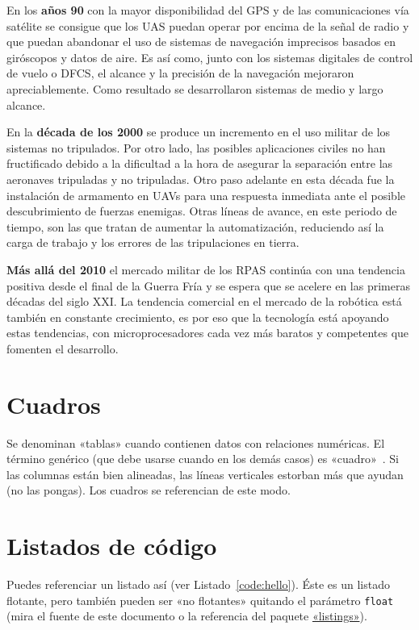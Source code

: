 En los \textbf{años 90} con la mayor disponibilidad del \acs{GPS} y de las comunicaciones vía satélite se consigue que los \acs{UAS} puedan operar por encima de la señal de radio y que puedan abandonar el uso de sistemas de navegación imprecisos basados en giróscopos y
datos de aire. Es así como, junto con los sistemas digitales de control de vuelo o \acs{DFCS}, el alcance y la precisión de la navegación mejoraron apreciablemente. 
Como resultado se desarrollaron sistemas de medio y largo alcance. 

En la \textbf{década de los 2000} se produce un incremento en el uso militar de los sistemas no tripulados. 
Por otro lado, las posibles aplicaciones civiles no han fructificado debido a la dificultad a la hora de asegurar la 
separación entre las aeronaves tripuladas y no tripuladas.
Otro paso adelante en esta década fue la instalación de armamento en \acs{UAV}s para una respuesta inmediata ante el posible 
descubrimiento de fuerzas enemigas.
Otras líneas de avance, en este periodo de tiempo, son las que tratan de aumentar la automatización, reduciendo así
la carga de trabajo y los errores de las tripulaciones en tierra.

\textbf{Más allá del 2010} el mercado militar de los \acs{RPAS} continúa con una tendencia positiva desde el final de la Guerra Fría y se espera que se acelere en las primeras décadas del siglo XXI.
La tendencia comercial en el mercado de la robótica está también en constante crecimiento, es por eso que la tecnología está apoyando estas tendencias, con microprocesadores cada vez más baratos y competentes que fomenten el desarrollo. 

\section{Cuadros}
\label{sec:uncuadro}

Se denominan «tablas» cuando contienen datos con relaciones numéricas. El
término genérico (que debe usarse cuando en los demás casos) es
«cuadro»~\cite{sousa}. Si las columnas están bien alineadas, las líneas
verticales estorban más que ayudan (no las pongas). Los cuadros se referencian
de este modo.


\section{Listados de código}
\label{sec:listado}

Puedes referenciar un listado así (ver Listado~\ref{code:hello}). Éste es un
listado flotante, pero también pueden ser «no flotantes» quitando el parámetro
\texttt{float} (mira el fuente de este documento o la referencia del paquete
\href{http://www.ctan.org/get/macros/latex/contrib/listings/listings.pdf}{«listings»}).

